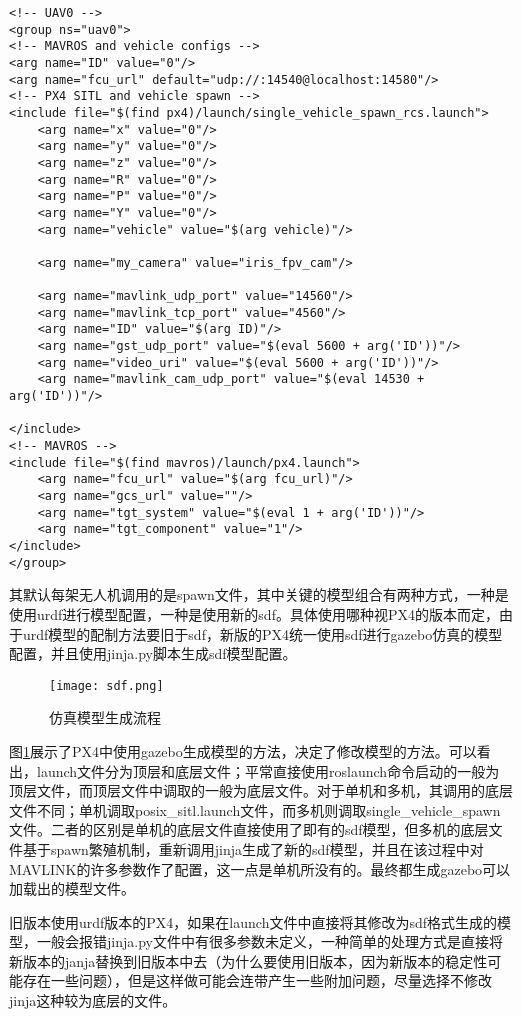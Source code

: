 \begin{verbatim}
<!-- UAV0 -->
<group ns="uav0">
<!-- MAVROS and vehicle configs -->
<arg name="ID" value="0"/>
<arg name="fcu_url" default="udp://:14540@localhost:14580"/>
<!-- PX4 SITL and vehicle spawn -->
<include file="$(find px4)/launch/single_vehicle_spawn_rcs.launch">
    <arg name="x" value="0"/>
    <arg name="y" value="0"/>
    <arg name="z" value="0"/>
    <arg name="R" value="0"/>
    <arg name="P" value="0"/>
    <arg name="Y" value="0"/>
    <arg name="vehicle" value="$(arg vehicle)"/>

    <arg name="my_camera" value="iris_fpv_cam"/>

    <arg name="mavlink_udp_port" value="14560"/>
    <arg name="mavlink_tcp_port" value="4560"/>
    <arg name="ID" value="$(arg ID)"/>
    <arg name="gst_udp_port" value="$(eval 5600 + arg('ID'))"/>
    <arg name="video_uri" value="$(eval 5600 + arg('ID'))"/>
    <arg name="mavlink_cam_udp_port" value="$(eval 14530 + arg('ID'))"/>

</include>
<!-- MAVROS -->
<include file="$(find mavros)/launch/px4.launch">
    <arg name="fcu_url" value="$(arg fcu_url)"/>
    <arg name="gcs_url" value=""/>
    <arg name="tgt_system" value="$(eval 1 + arg('ID'))"/>
    <arg name="tgt_component" value="1"/>
</include>
</group>
\end{verbatim}

其默认每架无人机调用的是spawn文件，其中关键的模型组合有两种方式，一种是使用urdf进行模型配置，一种是使用新的sdf。具体使用哪种视PX4的版本而定，由于urdf模型的配制方法要旧于sdf，新版的PX4统一使用sdf进行gazebo仿真的模型配置，并且使用jinja.py脚本生成sdf模型配置。

\begin{figure}[!ht]
	\centering
	\texttt{[image: sdf.png]}
	\caption{仿真模型生成流程}
	\label{fig-sdf}
\end{figure}

图\ref{fig-sdf}展示了PX4中使用gazebo生成模型的方法，决定了修改模型的方法。可以看出，launch文件分为顶层和底层文件；平常直接使用roslaunch命令启动的一般为顶层文件，而顶层文件中调取的一般为底层文件。对于单机和多机，其调用的底层文件不同；单机调取posix\_sitl.launch文件，而多机则调取single\_vehicle\_spawn文件。二者的区别是单机的底层文件直接使用了即有的sdf模型，但多机的底层文件基于spawn繁殖机制，重新调用jinja生成了新的sdf模型，并且在该过程中对MAVLINK的许多参数作了配置，这一点是单机所没有的。最终都生成gazebo可以加载出的模型文件。

旧版本使用urdf版本的PX4，如果在launch文件中直接将其修改为sdf格式生成的模型，一般会报错jinja.py文件中有很多参数未定义，一种简单的处理方式是直接将新版本的janja替换到旧版本中去（为什么要使用旧版本，因为新版本的稳定性可能存在一些问题），但是这样做可能会连带产生一些附加问题，尽量选择不修改jinja这种较为底层的文件。

